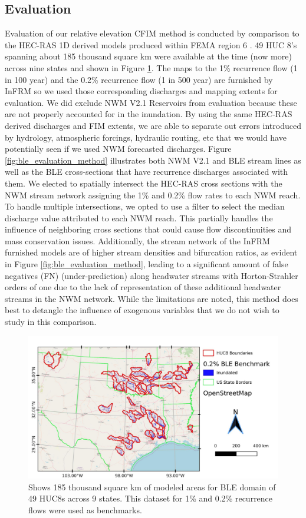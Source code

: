 \documentclass[draft]{dependencies/agujournal2019}
\begin{document}
\subsection{Evaluation}
\label{ssec:evaluation}
%
Evaluation of our relative elevation CFIM method is conducted by comparison to the HEC-RAS 1D derived models produced within FEMA region 6 \cite{fema2021base,fema2021estimated}.
49 HUC 8's spanning about 185 thousand square km were available at the time (now more) across nine states and shown in Figure \ref{fig:all_ble_maps}.
The maps to the 1\% recurrence flow (1 in 100 year) and the 0.2\% recurrence flow (1 in 500 year) are furnished by InFRM so we used those corresponding discharges and mapping extents for evaluation.
We did exclude NWM V2.1 Reservoirs from evaluation because these are not properly accounted for in the inundation.
By using the same HEC-RAS derived discharges and FIM extents, we are able to separate out errors introduced by hydrology, atmospheric forcings, hydraulic routing, etc that we would have potentially seen if we used NWM forecasted discharges.
Figure \ref{fig:ble_evaluation_method} illustrates both NWM V2.1 and BLE stream lines as well as the BLE cross-sections that have recurrence discharges associated with them.
We elected to spatially intersect the HEC-RAS cross sections with the NWM stream network assigning the 1\% and 0.2\% flow rates to each NWM reach. 
To handle multiple intersections, we opted to use a filter to select the median discharge value attributed to each NWM reach.
This partially handles the influence of neighboring cross sections that could cause flow discontinuities and mass conservation issues.
Additionally, the stream network of the InFRM furnished models are of higher stream densities and bifurcation ratios, as evident in Figure \ref{fig:ble_evaluation_method}, leading to a significant amount of false negatives (FN) (under-prediction) along headwater streams with Horton-Strahler orders of one due to the lack of representation of these additional headwater streams in the NWM network.
While the limitations are noted, this method does best to detangle the influence of exogenous variables that we do not wish to study in this comparison.
%
\begin{figure}[h!]
\centering
\includegraphics[scale=1.0]{figures/all_ble_maps.jpg}
\caption{Shows 185 thousand square km of modeled areas for BLE domain of 49 HUC8s across 9 states. This dataset for 1\% and 0.2\% recurrence flows were used as benchmarks.}
\label{fig:all_ble_maps}
\end{figure}
\end{document}
